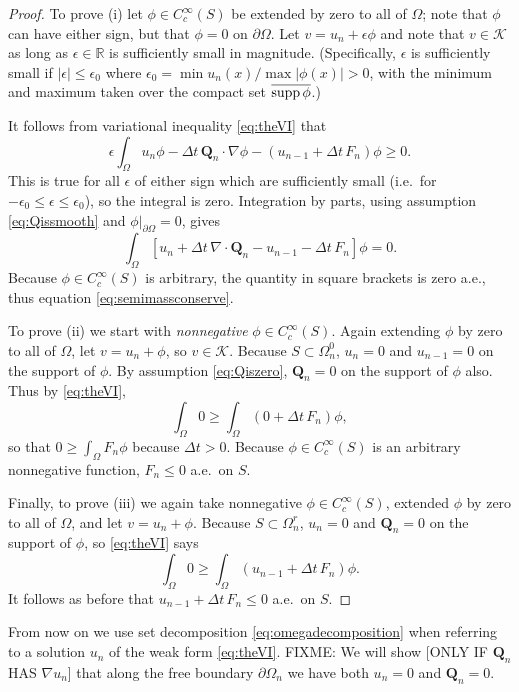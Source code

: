 \documentclass[final,leqno,onefignum,onetabnum]{siamltex1213bueler}
\newcommand\bQ{\mathbf{Q}}
\newcommand{\Div}{\nabla\cdot}
\newcommand\eps{\epsilon}
\renewcommand{\grad}{\nabla}
\newcommand\RR{\mathbb{R}}
\begin{document}
\medskip
\begin{proof}  To prove (i) let $\phi\in C_c^\infty(S)$ be extended by zero to all of $\Omega$; note that $\phi$ can have either sign, but that $\phi=0$ on $\partial\Omega$.  Let $v = u_n + \eps \phi$ and note that $v \in \mathcal{K}$ as long as $\eps\in\RR$ is sufficiently small in magnitude.  (Specifically, $\eps$ is sufficiently small if $|\eps|\le \eps_0$ where $\eps_0 = \min u_n(x) / \max |\phi(x)| > 0$, with the minimum and maximum taken over the compact set $\overline{\supp \phi}$.)

It follows from variational inequality \eqref{eq:theVI} that
   $$\eps \int_\Omega u_n \phi - \Delta t\,\bQ_n \cdot \grad \phi - (u_{n-1} + \Delta t\,F_n)\phi \ge 0.$$
This is true for all $\eps$ of either sign which are sufficiently small (i.e.~for $-\eps_0 \le \eps \le \eps_0$), so the integral is zero.  Integration by parts, using assumption \eqref{eq:Qissmooth} and $\phi\big|_{\partial\Omega}=0$, gives
   $$\int_\Omega \left[u_n + \Delta t\,\Div\bQ_n - u_{n-1} - \Delta t\,F_n \right]\phi = 0.$$
Because $\phi\in C_c^\infty(S)$ is arbitrary, the quantity in square brackets is zero a.e., thus equation \eqref{eq:semimassconserve}.

To prove (ii) we start with \emph{nonnegative} $\phi\in C_c^\infty(S)$.  Again extending $\phi$ by zero to all of $\Omega$, let $v = u_n + \phi$, so $v\in\mathcal{K}$.  Because $S\subset \Omega_n^0$, $u_n=0$ and $u_{n-1}=0$ on the support of $\phi$.  By assumption \eqref{eq:Qiszero}, $\bQ_n=0$ on the support of $\phi$ also.  Thus by \eqref{eq:theVI},
    $$\int_{\Omega} 0 \ge \int_{\Omega} \left(0 + \Delta t\, F_n\right) \phi,$$
so that $0 \ge \int_{\Omega} F_n \phi$ because $\Delta t>0$.  Because $\phi\in C_c^\infty(S)$ is an arbitrary nonnegative function, $F_n \le 0$ a.e.~on $S$.

Finally, to prove (iii) we again take nonnegative $\phi\in C_c^\infty(S)$, extended $\phi$ by zero to all of $\Omega$, and let $v=u_n+\phi$.  Because $S\subset \Omega_n^r$, $u_n=0$ and $\bQ_n=0$ on the support of $\phi$, so \eqref{eq:theVI} says
    $$\int_{\Omega} 0 \ge \int_{\Omega} \left(u_{n-1} + \Delta t\, F_n\right) \phi.$$
It follows as before that $u_{n-1} + \Delta t\, F_n \le 0$ a.e.~on $S$.
\end{proof}

\medskip
From now on we use set decomposition \eqref{eq:omegadecomposition} when referring to a solution $u_n$ of the weak form \eqref{eq:theVI}.  FIXME:  We will show [ONLY IF $\bQ_n$ HAS $\grad u_n$] that along the free boundary $\partial\Omega_n$ we have both $u_n=0$ and $\bQ_n = 0$.
\end{document}
